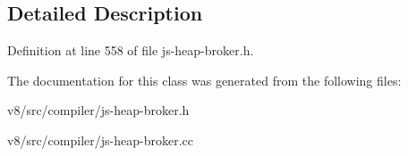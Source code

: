 \subsection{Detailed Description}


Definition at line 558 of file js-\/heap-\/broker.\+h.



The documentation for this class was generated from the following files\+:\begin{DoxyCompactItemize}
\item 
v8/src/compiler/js-\/heap-\/broker.\+h\item 
v8/src/compiler/js-\/heap-\/broker.\+cc\end{DoxyCompactItemize}

